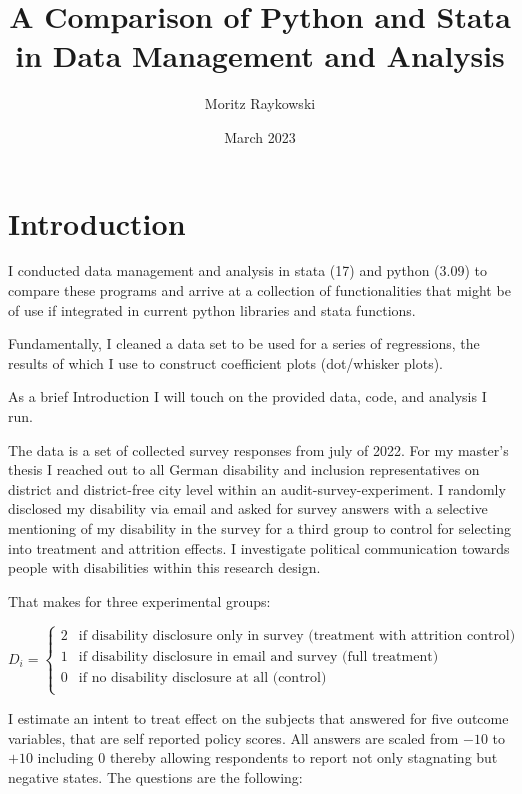 \documentclass[10pt]{article}
\title{A Comparison of Python and Stata in Data Management and Analysis
}
\author{Moritz Raykowski}
\date{March 2023}
\begin{document}
\section{Introduction}
I conducted data management and analysis in stata (17) and python (3.09) to compare these programs 
and arrive at a collection of functionalities that might be of use if integrated in current python 
libraries and stata functions.

Fundamentally, I cleaned a data set to be used for a series of regressions, the results of which I use to construct coefficient plots 
(dot/whisker plots).

As a brief Introduction I will touch on the provided data, code, and analysis I run.

The data is a set of collected survey responses from july of 2022. For my master's thesis I reached out to all German 
disability and inclusion representatives on district and district-free city level within an audit-survey-experiment.
I randomly disclosed my disability via email and asked for survey answers with a selective mentioning of my disability 
in the survey for a third group to control for selecting into treatment and attrition effects.
I investigate political communication towards people with disabilities within this research design.

That makes for three experimental groups:

\begin{equation}
    D_{i} = \begin{cases}
          2 & \text{if disability disclosure only in survey (treatment with attrition control)}\\
          1 & \text{if disability disclosure in email and survey (full treatment)}\\
          0 & \text{if no disability disclosure at all (control)}\\
        \end{cases} 
    \end{equation}

I estimate an intent to treat effect on the subjects that answered for five outcome variables, that are 
self reported policy scores. 
All answers are scaled from $-10$ to $+10$ including $0$ thereby allowing respondents to report 
not only stagnating but negative states. The questions are the following:
\end{document}
